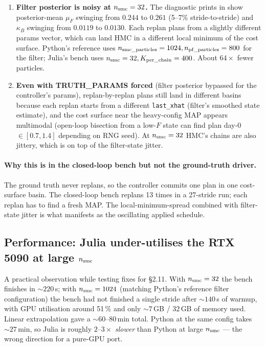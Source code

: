 \documentclass[11pt,a4paper]{article}
\begin{document}
\begin{enumerate}[itemsep=2pt,leftmargin=*]
\item \textbf{Filter posterior is noisy at $n_{\rm smc} = 32$.} The
  diagnostic prints in  show
  posterior-mean $\mu_F$ swinging from $0.244$ to $0.261$ (5--7\%
  stride-to-stride) and $\kappa_B$ swinging from $0.0119$ to $0.0130$.
  Each replan plans from a slightly different params vector, which
  can land HMC in a different local minimum of the cost surface.
  Python's reference uses $n_{\rm smc\_particles} = 1024,
  n_{\rm pf\_particles} = 800$ for the filter; Julia's bench uses
  $n_{\rm smc} = 32, K_{\rm per\_chain} = 400$. About $64\times$
  fewer particles.
\item \textbf{Even with TRUTH\_PARAMS forced} (filter posterior bypassed
  for the controller's params), replan-by-replan plans still land in
  different basins because each replan starts from a different
  \texttt{last\_xhat} (filter's smoothed state estimate), and the cost
  surface near the heavy-config MAP appears multimodal (open-loop
  bisection from a low-$F$ state can find plan day-0 $\in [0.7, 1.4]$
  depending on RNG seed). At $n_{\rm smc}=32$ HMC's chains are also
  jittery, which is on top of the filter-state jitter.
\end{enumerate}

\paragraph{Why this is in the closed-loop bench but not the ground-truth driver.}
The ground truth never replans, so the controller commits one plan
in one cost-surface basin. The closed-loop bench replans 13 times in
a 27-stride run; each replan has to find a fresh MAP. The
local-minimum-spread combined with filter-state jitter is what
manifests as the oscillating applied schedule.

\subsection{Performance: Julia under-utilises the RTX 5090 at large $n_{\rm smc}$}

A practical observation while testing fixes for \S 2.11. With
$n_{\rm smc} = 32$ the bench finishes in $\sim 220\,$s; with
$n_{\rm smc} = 1024$ (matching Python's reference filter
configuration) the bench had not finished a single stride after
$\sim 140\,$s of warmup, with GPU utilisation around 51\,\% and only
$\sim 7\,$GB / $32\,$GB of memory used. Linear extrapolation gave a
$\sim 60$--$80\,$min total. Python at the same config takes $\sim
27\,$min, so Julia is roughly $2$--$3\times$ \emph{slower} than Python
at large $n_{\rm smc}$ --- the wrong direction for a pure-GPU port.
\end{document}
